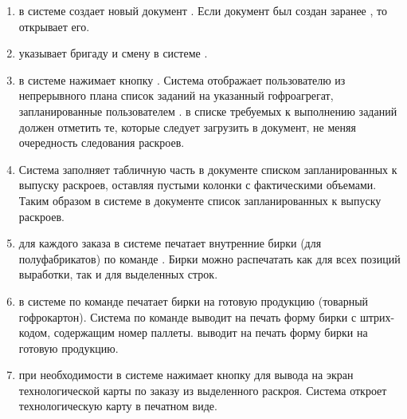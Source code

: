 \begin{enumerate}
\item  \gaoperator в системе \gofro создает новый документ . Если документ был создан заранее \planner, то \gaoperator открывает его.
\item  \gaoperator указывает бригаду и смену в системе \gofro.
\item  \gaoperator в системе \gofro нажимает кнопку . Система \gofro отображает пользователю из непрерывного плана список заданий на указанный гофроагрегат, запланированные пользователем \planner. \gaoperator в списке требуемых к выполнению заданий должен отметить те, которые следует загрузить в документ, не меняя очередность следования раскроев. 
\item Система \gofro заполняет табличную часть в документе  списком запланированных к выпуску раскроев, оставляя пустыми колонки с фактическими объемами. Таким образом  в системе \gofro в документе  список запланированных к выпуску раскроев.
\item  \gaoperator	для каждого заказа  в системе \gofro печатает внутренние бирки (для полуфабрикатов) по команде . Бирки можно распечатать как для всех позиций выработки, так и для выделенных строк.
\item  \gaoperator в системе \gofro по команде  печатает бирки на готовую продукцию (товарный гофрокартон).%
Система \gofro по команде 
\ifnum{}
   выводит на печать форму бирки с штрих-кодом, 
   содержащим %
   номер паллеты.
\else
   выводит на печать форму бирки на готовую продукцию. 
\fi
\item  \gaoperator	при необходимости в системе \gofro  нажимает кнопку  для вывода на экран технологической  карты по заказу из выделенного раскроя. Система \gofro откроет технологическую карту в печатном виде.

\end{enumerate}
